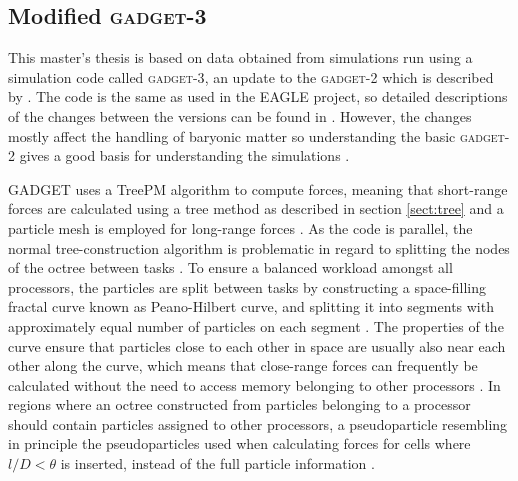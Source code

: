 \documentclass[english, oneside]{HYgradu}
\begin{document}




\subsection{Modified \textsc{gadget-3}} \label{sect:gadget}
This master's thesis is based on data obtained from simulations run using a simulation code called \textsc{gadget-3}, an update to the \textsc{gadget-2} which is described by \citet{springel2005cosmological}. The code is the same as used in the EAGLE project, so detailed descriptions of the changes between the versions can be found in \citet{schaye2015eagle}. However, the changes mostly affect the handling of baryonic matter so understanding the basic \textsc{gadget-2} gives a good basis for understanding the simulations \citep{schaye2015eagle}.

GADGET uses a TreePM algorithm to compute forces, meaning that short-range forces are calculated using a tree method as described in section \ref{sect:tree} and a particle mesh is employed for long-range forces \citep{springel2005cosmological}. As the code is parallel, the normal tree-construction algorithm is problematic in regard to splitting the nodes of the octree between tasks \citep{springel2005cosmological}. To ensure a balanced workload amongst all processors, the particles are split between tasks by constructing a space-filling fractal curve known as Peano-Hilbert curve, and splitting it into segments with approximately equal number of particles on each segment \citep{springel2005cosmological}. The properties of the curve ensure that particles close to each other in space are usually also near each other along the curve, which means that close-range forces can frequently be calculated without the need to access memory belonging to other processors \citep{springel2005cosmological}. In regions where an octree constructed from particles belonging to a processor should contain particles assigned to other processors, a pseudoparticle resembling in principle the pseudoparticles used when calculating forces for cells where $l/D < \theta$ is inserted, instead of the full particle information \citep{springel2005cosmological}.
\end{document}
